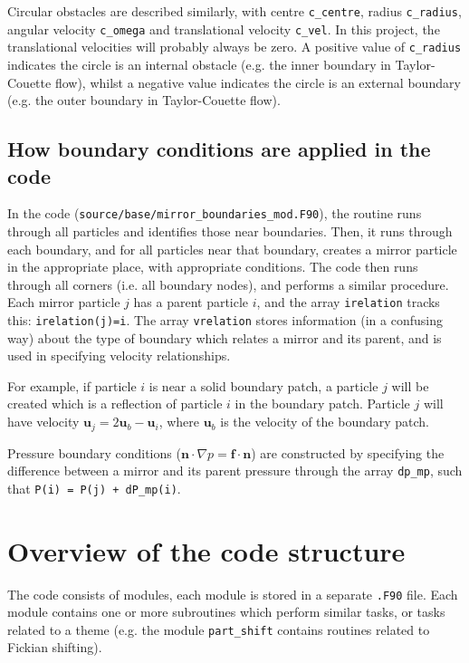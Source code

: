 \documentclass[notitlepage]{revtex4-2}
\begin{document}
Circular obstacles are described similarly, with centre \verb!c_centre!, radius \verb|c_radius|, angular velocity \verb|c_omega| and translational velocity \verb|c_vel|. In this project, the translational velocities will probably always be zero. A positive value of \verb|c_radius| indicates the circle is an internal obstacle (e.g. the inner boundary in Taylor-Couette flow), whilst a negative value indicates the circle is an external boundary (e.g. the outer boundary in Taylor-Couette flow).

\subsection{How boundary conditions are applied in the code}

In the code (\verb|source/base/mirror_boundaries_mod.F90|), the routine runs through all particles and identifies those near boundaries. Then, it runs through each boundary, and for all particles near that boundary, creates a mirror particle in the appropriate place, with appropriate conditions. The code then runs through all corners (i.e. all boundary nodes), and performs a similar procedure. Each mirror particle $j$ has a parent particle $i$, and the array \verb|irelation| tracks this: \verb|irelation(j)=i|. The array \verb|vrelation| stores information (in a confusing way) about the type of boundary which relates a mirror and its parent, and is used in specifying velocity relationships.

For example, if particle $i$ is near a solid boundary patch, a particle $j$ will be created which is a reflection of particle $i$ in the boundary patch. Particle $j$ will have velocity $\bm{u}_{j}=2\bm{u}_{b}-\bm{u}_{i}$, where $\bm{u}_{b}$ is the velocity of the boundary patch.

Pressure boundary conditions ($\bm{n}\cdot\nabla{p}=\bm{f}\cdot\bm{n}$) are constructed by specifying the difference between a mirror and its parent pressure through the array \verb|dp_mp|, such that \verb|P(i) = P(j) + dP_mp(i)|.

\section{Overview of the code structure}

The code consists of modules, each module is stored in a separate \verb|.F90| file. Each module contains one or more subroutines which perform similar tasks, or tasks related to a theme (e.g. the module \verb|part_shift| contains routines related to Fickian shifting).
\end{document}
